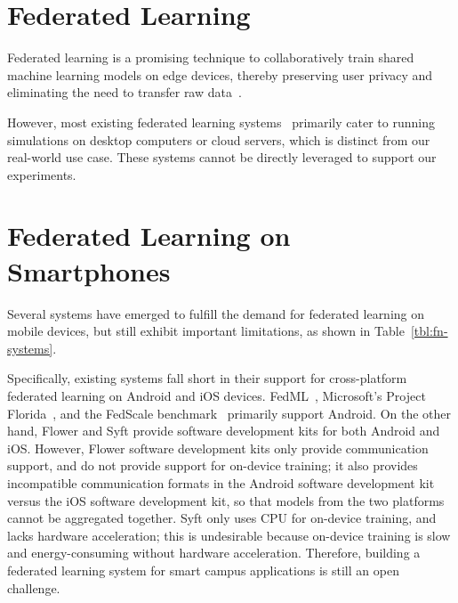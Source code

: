 \section{Federated Learning}

Federated learning is a promising technique to collaboratively train
shared machine learning models on edge devices,
thereby preserving user privacy and eliminating the need to
transfer raw data~\cite{mcmahan2017communication}.

However, most existing federated learning systems~\cite[e.g.,][]{
    bonawitz2019towards,ma2019paddlepaddle,liu2021fate,openfl_citation,
} primarily cater to running simulations on desktop computers or cloud servers,
which is distinct from our real-world use case.
These systems cannot be directly leveraged to support our experiments.

\section{Federated Learning on Smartphones}

Several systems have emerged to fulfill the demand for federated learning on
mobile devices, but still exhibit important limitations,
as shown in Table~\ref{tbl:fn-systems}.

Specifically, existing systems fall short in their support for
cross-platform federated learning on Android and iOS devices.
FedML~\cite{he2020fedml},
Microsoft's Project Florida~\cite{madrigal2023project},
and the FedScale benchmark~\cite{lai2022fedscale} primarily support Android.
On the other hand,
Flower \cite{beutel2020flower,mathur2021ondevice} and
Syft \cite{ryffel2018generic,Ziller2021,hall2021syft}
provide software development kits for both Android and iOS.
However, Flower software development kits only provide communication support,
and do not provide support for on-device training;
it also provides incompatible communication formats in
the Android software development kit versus the iOS software development kit,
so that models from the two platforms cannot be aggregated together.
Syft only uses CPU for on-device training, and lacks hardware acceleration;
this is undesirable because on-device training is slow and energy-consuming
without hardware acceleration.
Therefore, building a federated learning system for smart campus applications is
still an open challenge.

